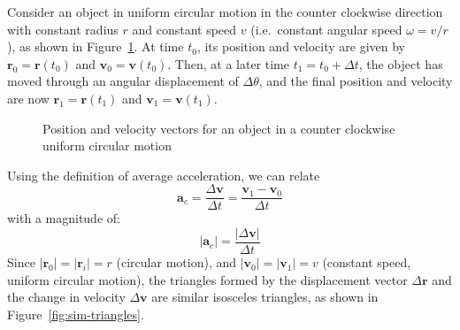 Consider an object in uniform circular motion in the counter clockwise
direction with constant radius $r$ and constant speed $v$ (i.e.\ constant
angular speed $\omega=v/r$), as shown in
Figure~\ref{fig:v-in-uniform-circ-motion}. At time $t_0$, its position and
velocity are given by $\bm r_0=\bm r(t_0)$ and $\bm v_0=\bm v(t_0)$. Then, at a
later time $t_1=t_0+\Delta t$, the object has moved through an angular
displacement of $\Delta\theta$, and the final position and velocity are now
$\bm r_1=\bm r(t_1)$ and $\bm v_1=\bm v(t_1)$.
\begin{figure}[ht]
  \centering
  \caption{Position and velocity vectors for an object in a counter clockwise
    uniform circular motion}
  \label{fig:v-in-uniform-circ-motion}
\end{figure}
Using the definition of average acceleration, we can relate
\begin{equation}
  \bm a_c=\frac{\Delta\bm v}{\Delta t}=\frac{\bm v_1-\bm v_0}{\Delta t}
\end{equation}
with a magnitude of:
\begin{equation}
  |\bm a_c|=\frac{|\Delta\bm v|}{\Delta t}
\end{equation}
Since $|\bm r_0|=|\bm r_i|=r$ (circular motion), and $|\bm v_0|=|\bm v_1|=v$
(constant speed, uniform circular motion), the triangles formed by the
displacement vector $\Delta\bm r$ and the change in velocity $\Delta\bm v$ are
similar isosceles triangles, as shown in Figure~\ref{fig:sim-triangles}.
